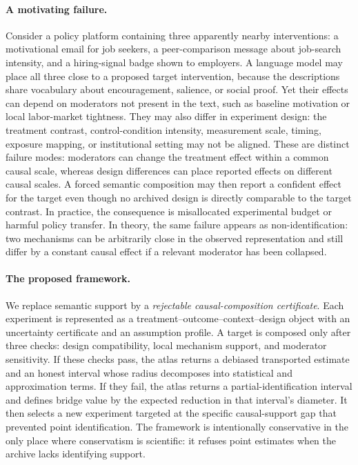 \documentclass[11pt]{article}
\numberwithin{equation}{section}
\newcommand{\1}{\mathbf 1}
\begin{document}
\paragraph{A motivating failure.}
Consider a policy platform containing three apparently nearby interventions: a motivational email for job seekers, a peer-comparison message about job-search intensity, and a hiring-signal badge shown to employers.  A language model may place all three close to a proposed target intervention, because the descriptions share vocabulary about encouragement, salience, or social proof.  Yet their effects can depend on moderators not present in the text, such as baseline motivation or local labor-market tightness.  They may also differ in experiment design: the treatment contrast, control-condition intensity, measurement scale, timing, exposure mapping, or institutional setting may not be aligned.  These are distinct failure modes: moderators can change the treatment effect within a common causal scale, whereas design differences can place reported effects on different causal scales.  A forced semantic composition may then report a confident effect for the target even though no archived design is directly comparable to the target contrast.  In practice, the consequence is misallocated experimental budget or harmful policy transfer.  In theory, the same failure appears as non-identification: two mechanisms can be arbitrarily close in the observed representation and still differ by a constant causal effect if a relevant moderator has been collapsed.

\paragraph{The proposed framework.}
We replace semantic support by a \emph{rejectable causal-composition certificate}.  Each experiment is represented as a treatment--outcome--context--design object with an uncertainty certificate and an assumption profile.  A target is composed only after three checks: design compatibility, local mechanism support, and moderator sensitivity.  If these checks pass, the atlas returns a debiased transported estimate and an honest interval whose radius decomposes into statistical and approximation terms.  If they fail, the atlas returns a partial-identification interval and defines bridge value by the expected reduction in that interval's diameter. It then selects a new experiment targeted at the specific causal-support gap that prevented point identification.  The framework is intentionally conservative in the only place where conservatism is scientific: it refuses point estimates when the archive lacks identifying support.
\end{document}

